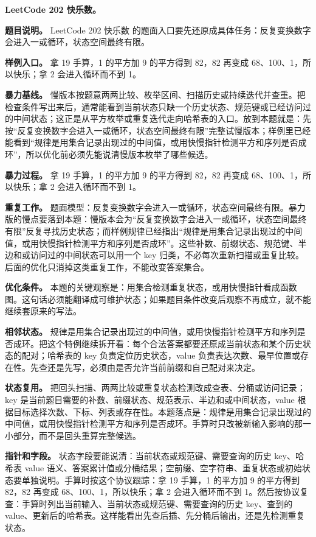 \noindent\textbf{LeetCode 202 快乐数。}

\textbf{题目说明。} LeetCode 202 快乐数 的题面入口要先还原成具体任务：反复变换数字会进入一或循环，状态空间最终有限。

\textbf{样例入口。} 拿 19 手算，1 的平方加 9 的平方得到 82，82 再变成 68、100、1，所以快乐；拿 2 会进入循环而不到 1。

\textbf{暴力基线。} 慢版本按题意两两比较、枚举区间、扫描历史或持续迭代并查重。把检查条件写出来后，通常能看到当前状态只缺一个历史状态、规范键或已经访问过的中间状态；这正是从平方枚举或重复迭代走向哈希表的入口。放到本题就是：先按“反复变换数字会进入一或循环，状态空间最终有限”完整试慢版本；样例里已经能看到“规律是用集合记录出现过的中间值，或用快慢指针检测平方和序列是否成环”，所以优化前必须先能说清慢版本枚举了哪些候选。

\textbf{暴力过程。} 拿 19 手算，1 的平方加 9 的平方得到 82，82 再变成 68、100、1，所以快乐；拿 2 会进入循环而不到 1。

\textbf{重复工作。} 题面模型：反复变换数字会进入一或循环，状态空间最终有限。暴力版的慢点要落到本题：慢版本会为“反复变换数字会进入一或循环，状态空间最终有限”反复寻找历史状态；而样例规律已经指出“规律是用集合记录出现过的中间值，或用快慢指针检测平方和序列是否成环”。这些补数、前缀状态、规范键、半边和或访问过的中间状态可以用一个 key 归类，不必每次重新扫描或重复比较。后面的优化只消掉这类重复工作，不能改变答案集合。

\textbf{优化条件。} 本题的关键观察是：用集合检测重复状态，或用快慢指针看成函数图。这句话必须能翻译成可维护状态；如果题目条件改变后观察不再成立，就不能继续套原来的写法。

\textbf{相邻状态。} 规律是用集合记录出现过的中间值，或用快慢指针检测平方和序列是否成环。把这个特例继续拆开看：每个合法答案都要还原成当前状态和某个历史状态的配对；哈希表的 key 负责定位历史状态，value 负责表达次数、最早位置或存在性。先查还是先写，必须由是否允许当前前缀和自己配对来决定。

\textbf{状态复用。} 把回头扫描、两两比较或重复状态检测改成查表、分桶或访问记录；key 是当前题目需要的补数、前缀状态、规范表示、半边和或中间状态，value 根据目标选择次数、下标、列表或存在性。本题落点是：规律是用集合记录出现过的中间值，或用快慢指针检测平方和序列是否成环。手算时只改被新输入影响的那一小部分，而不是回头重算完整候选。

\textbf{指针和字段。} 状态字段要能说清：当前状态或规范键、需要查询的历史 key、哈希表 value 语义、答案累计值或分桶结果；空前缀、空字符串、重复状态或初始状态要单独说明。手算时按这个协议跟踪：拿 19 手算，1 的平方加 9 的平方得到 82，82 再变成 68、100、1，所以快乐；拿 2 会进入循环而不到 1。然后按协议复查：手算时列出当前输入、当前状态或规范键、需要查询的历史 key、查到的 value、更新后的哈希表。这样能看出先查后插、先分桶后输出，还是先检测重复状态。


